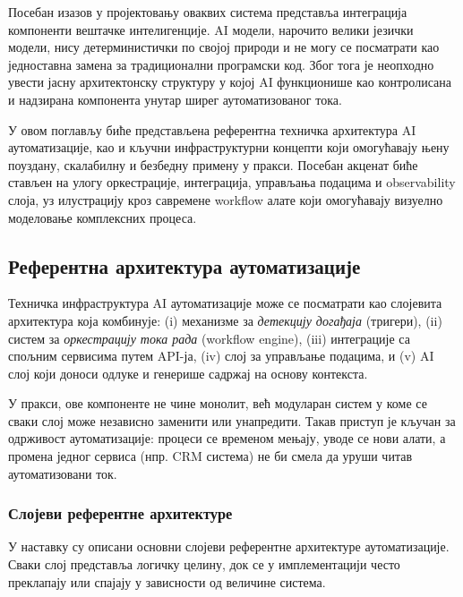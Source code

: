 Посебан изазов у пројектовању оваквих система представља интеграција компоненти вештачке интелигенције.
AI модели, нарочито велики језички модели, нису детерминистички по својој природи и не могу се посматрати као
једноставна замена за традиционални програмски код. Због тога је неопходно увести јасну архитектонску структуру
у којој AI функционише као контролисана и надзирана компонента унутар ширег аутоматизованог тока.

У овом поглављу биће представљена референтна техничка архитектура AI аутоматизације, као и кључни инфраструктурни
концепти који омогућавају њену поуздану, скалабилну и безбедну примену у пракси. Посебан акценат биће стављен
на улогу оркестрације, интеграција, управљања подацима и observability слоја, уз илустрацију кроз савремене
workflow алате који омогућавају визуелно моделовање комплексних процеса.


\subsection{Референтна архитектура аутоматизације}
\label{sec:ref_arch}

Техничка инфраструктура AI аутоматизације може се посматрати као слојевита архитектура која комбинује:
(i) механизме за \textit{детекцију догађаја} (тригери), (ii) систем за \textit{оркестрацију тока рада} (workflow engine),
(iii) интеграције са спољним сервисима путем API-ја, (iv) слој за управљање подацима, и (v) AI слој који доноси
одлуке и генерише садржај на основу контекста.

У пракси, ове компоненте не чине монолит, већ модуларан систем у коме се сваки слој може независно заменити
или унапредити. Такав приступ је кључан за одрживост аутоматизације: процеси се временом мењају, уводе се нови алати,
а промена једног сервиса (нпр. CRM система) не би смела да уруши читав аутоматизовани ток.

\subsubsection{Слојеви референтне архитектуре}

У наставку су описани основни слојеви референтне архитектуре аутоматизације. Сваки слој представља логичку целину,
док се у имплементацији често преклапају или спајају у зависности од величине система.

